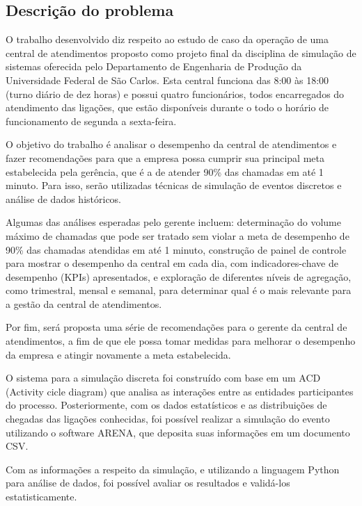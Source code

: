 \subsection{Descrição do problema}
\label{section: descricao}
O trabalho desenvolvido diz respeito ao estudo de caso da operação de uma central de atendimentos proposto como projeto final da disciplina de simulação de sistemas oferecida pelo Departamento de Engenharia de Produção da Universidade Federal de São Carlos. Esta central funciona das 8:00 às 18:00 (turno diário de dez horas) e possui quatro funcionários, todos encarregados do atendimento das ligações, que estão disponíveis durante o todo o horário de funcionamento de segunda a sexta-feira.

O objetivo do trabalho é analisar o desempenho da central de atendimentos e fazer recomendações para que a empresa possa cumprir sua principal meta estabelecida pela gerência, que é a de atender 90\% das chamadas em até 1 minuto. Para isso, serão utilizadas técnicas de simulação de eventos discretos e análise de dados históricos.

Algumas das análises esperadas pelo gerente incluem: determinação do volume máximo de chamadas que pode ser tratado sem violar a meta de desempenho de 90\% das chamadas atendidas em até 1 minuto, construção de painel de controle para mostrar o desempenho da central em cada dia, com indicadores-chave de desempenho (KPIs) apresentados, e exploração de diferentes níveis de agregação, como trimestral, mensal e semanal, para determinar qual é o mais relevante para a gestão da central de atendimentos.

Por fim, será proposta uma série de recomendações para o gerente da central de atendimentos, a fim de que ele possa tomar medidas para melhorar o desempenho da empresa e atingir novamente a meta estabelecida.

O sistema para a simulação discreta foi construído com base em um ACD (Activity cicle diagram) que analisa as interações entre as entidades participantes do processo. Posteriormente, com os dados estatísticos e as distribuições de chegadas das ligações conhecidas, foi possível realizar a simulação do evento utilizando o software ARENA, que deposita suas informações em um documento CSV. 

Com as informações a respeito da simulação, e utilizando a linguagem Python para análise de dados, foi possível avaliar os resultados e validá-los estatisticamente.
